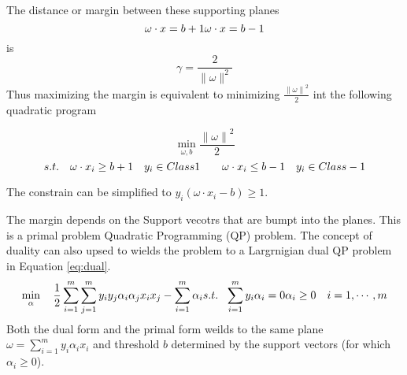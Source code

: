 The distance or margin between these supporting planes 
\begin{equation}
 \omega \cdot x=b+1 \\
  \omega \cdot x=b-1
\end{equation}
is 
\begin{equation}
 \gamma = \frac{2}{\parallel \omega \parallel^2}
\end{equation}
Thus maximizing the margin is equivalent to minimizing $\frac{{\parallel \omega \parallel}^2}{2}$ int the following quadratic program 


\begin{equation}
 \min_{\omega,b}  \frac{{\parallel \omega \parallel}^2}{2}
\end{equation}
\begin{equation}	
 s.t. \ \ \   \omega \cdot x_i \geq b+1 \ \ \    y_i \in Class 1 \\ 
 \ \ \ \ \ \   \omega \cdot x_i \leq b-1 \ \ \    y_i \in Class -1 
\end{equation}

The constrain can be simplified to $y_i(\omega \cdot x_i-b)\geq 1$. 


The margin depends on the Support vecotrs that are bumpt into the planes.  This is a primal problem Quadratic Programming (QP) problem. The concept of duality can also upsed to wields the problem to a  Largrnigian dual QP problem in Equation \ref{eq:dual}. 
\begin{equation}
\min_{\alpha} \ \ \   \frac{1}{2} \sum_{i=1}^{m}{\sum_{j=1}^{m}{y_iy_j\alpha_i\alpha_jx_ix_j}} - \sum_{i=1}^{m}{\alpha_i} \\
s.t. \ \ \sum_{i=1}^{m}{y_i\alpha_i}=0   \\
  \alpha_i \geq 0  \ \ \ i=1,\cdots , m 
\label{eq:dual}
\end{equation}
Both the dual form and the primal form weilds to the same plane $\omega=\sum_{i=1}^{m}y_i\alpha_i x_i$ and threshold $b$ determined by the support vectors (for which $\alpha_i\geq 0$). 


 

